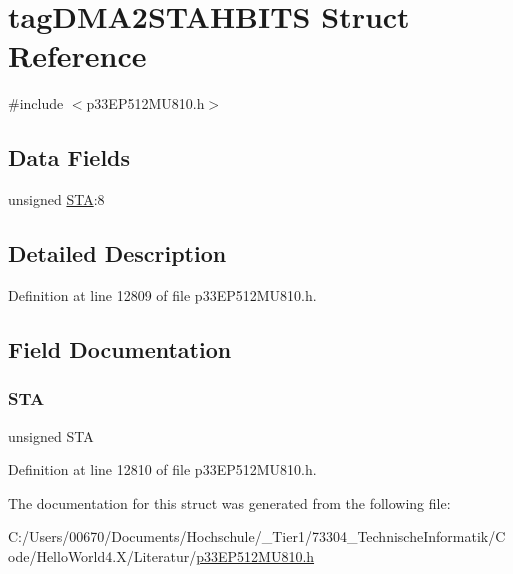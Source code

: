 \hypertarget{structtag_d_m_a2_s_t_a_h_b_i_t_s}{}\section{tag\+D\+M\+A2\+S\+T\+A\+H\+B\+I\+TS Struct Reference}
\label{structtag_d_m_a2_s_t_a_h_b_i_t_s}


{\ttfamily \#include $<$p33\+E\+P512\+M\+U810.\+h$>$}

\subsection*{Data Fields}
\begin{DoxyCompactItemize}
\item 
unsigned \hyperlink{structtag_d_m_a2_s_t_a_h_b_i_t_s_a0eec78ddd2c12af678d5fab70fe62d14}{S\+TA}\+:8
\end{DoxyCompactItemize}


\subsection{Detailed Description}


Definition at line 12809 of file p33\+E\+P512\+M\+U810.\+h.



\subsection{Field Documentation}
\mbox{\label{structtag_d_m_a2_s_t_a_h_b_i_t_s_a0eec78ddd2c12af678d5fab70fe62d14}} 
\subsubsection{\texorpdfstring{S\+TA}{STA}}
{\footnotesize\ttfamily unsigned S\+TA}



Definition at line 12810 of file p33\+E\+P512\+M\+U810.\+h.



The documentation for this struct was generated from the following file\+:\begin{DoxyCompactItemize}
\item 
C\+:/\+Users/00670/\+Documents/\+Hochschule/\+\_\+\+Tier1/73304\+\_\+\+Technische\+Informatik/\+Code/\+Hello\+World4.\+X/\+Literatur/\hyperlink{p33_e_p512_m_u810_8h}{p33\+E\+P512\+M\+U810.\+h}\end{DoxyCompactItemize}
